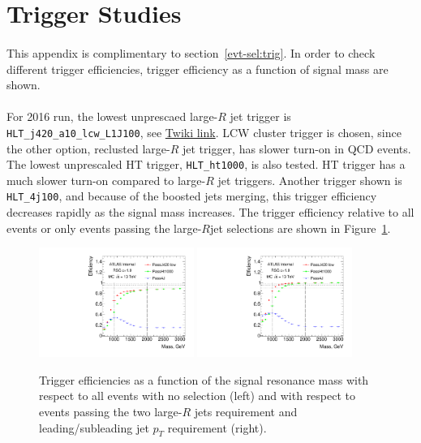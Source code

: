 \section{Trigger Studies} %
\label{app:trig}

\paragraph{} This appendix is complimentary to section~\ref{evt-sel:trig}. In order to check different trigger efficiencies, trigger efficiency as a function of signal mass are shown. 

\paragraph{} For 2016 run, the lowest unprescaed large-$R$ jet trigger is \verb|HLT_j420_a10_lcw_L1J100|, see \href{https://twiki.cern.ch/twiki/bin/viewauth/Atlas/LowestUnprescaled}{Twiki link}. LCW cluster trigger is chosen, since the other option, reclusted large-$R$ jet trigger, has slower turn-on in QCD events. The lowest unprescaled HT trigger, \verb|HLT_ht1000|, is also tested. HT trigger has a much slower turn-on compared to large-$R$ jet triggers. Another trigger shown is \verb|HLT_4j100|, and because of the boosted jets merging, this trigger efficiency decreases rapidly as the signal mass increases. The trigger efficiency relative to all events or only events passing the large-$R$jet selections are shown in Figure~\ref{fig:app-trig-eff-mass}.

\begin{figure}[htbp!]
\begin{center}
\includegraphics[angle=270, width=0.45\textwidth]{./figures/boosted/Trigger/app_trig_b77_Efficiency_PreSel.pdf}
\includegraphics[angle=270, width=0.45\textwidth]{./figures/boosted/Trigger/app_trig_b77_Efficiency_All.pdf}
  \caption{Trigger efficiencies as a function of the signal resonance mass with respect to all events with no selection (left) and with respect to events passing the two large-$R$ jets requirement and leading/subleading jet $p_{T}$ requirement (right). }
\label{fig:app-trig-eff-mass}
\end{center}
\end{figure}

